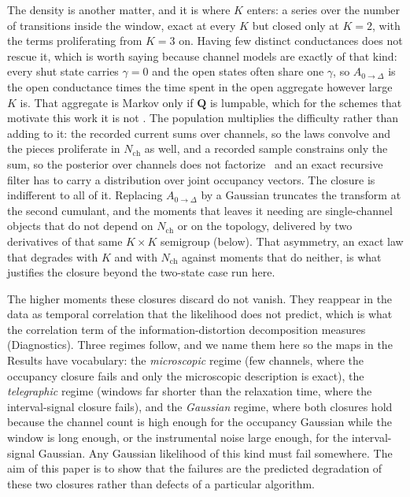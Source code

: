 The density is another matter, and it is where $K$ enters: a series over the number of
transitions inside the window, exact at every $K$ but closed only at $K=2$, with the terms
proliferating from $K=3$ on. Having few distinct conductances does not rescue it, which is
worth saying because channel models are exactly of that kind: every shut state carries
$\gamma=0$ and the open states often share one $\gamma$, so $A_{0\to\Delta}$ is the open
conductance times the time spent in the open aggregate however large $K$ is. That aggregate
is Markov only if $\mathbf{Q}$ is lumpable, which for the schemes that motivate this work it
is not \citep{colquhoun1981stochastic}. The population multiplies the difficulty rather than
adding to it: the recorded current sums over channels, so the laws convolve and the pieces
proliferate in $N_{\mathrm{ch}}$ as well, and a recorded sample constrains only the sum, so
the posterior over channels does not factorize~\citep{moffatt2007estimation} and an exact
recursive filter has to carry a distribution over joint occupancy vectors. The closure is
indifferent to all of it. Replacing $A_{0\to\Delta}$ by a Gaussian truncates the transform at the
second cumulant, and the moments that leaves it needing are single-channel objects that do
not depend on $N_{\mathrm{ch}}$ or on the topology, delivered by two derivatives of that
same $K\times K$ semigroup (below). That asymmetry, an exact law that degrades with $K$ and with
$N_{\mathrm{ch}}$ against moments that do neither, is what justifies the closure beyond the
two-state case run here.

The higher moments these closures discard do not vanish. They reappear in the data as
temporal correlation that the likelihood does not predict, which is what the correlation
term of the information-distortion decomposition measures (Diagnostics). Three regimes
follow, and we name them here so the maps in the Results have vocabulary: the
\emph{microscopic} regime (few channels, where the occupancy closure fails and only the
microscopic description is exact), the
\emph{telegraphic} regime (windows far shorter than the relaxation time, where the
interval-signal closure fails), and the \emph{Gaussian} regime, where both closures hold
because the channel count is high enough for the occupancy Gaussian while the window is long
enough, or the instrumental noise large enough, for the interval-signal Gaussian. Any Gaussian likelihood of this
kind must fail somewhere. The aim of this paper is to show that the failures are the
predicted degradation of these two closures rather than defects of a particular algorithm.

